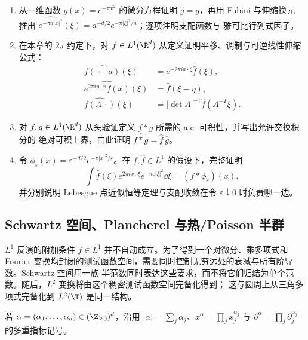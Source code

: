\begin{exercise}
\begin{enumerate}
  \item 从一维函数 $g(x)=e^{-\pi x^2}$ 的微分方程证明 $\widehat g=g$，再用 Fubini 与伸缩换元
        推出
        $\widehat{e^{-\pi a|x|^2}}(\xi)=a^{-d/2}e^{-\pi|\xi|^2/a}$；逐项注明支配函数与
        雅可比行列式因子。
  \item 在本章的 $2\pi$ 约定下，对 $f\in L^1(\R^d)$ 从定义证明平移、调制与可逆线性伸缩公式：
        \[
        \begin{aligned}
        \widehat{f(\,\cdot-a)}(\xi)
          &=e^{-2\pi ia\cdot\xi}\widehat f(\xi),\\
        \widehat{e^{2\pi i\eta\cdot x}f(x)}(\xi)
          &=\widehat f(\xi-\eta),\\
        \widehat{f(A\,\cdot)}(\xi)
          &=|\det A|^{-1}\widehat f(A^{-T}\xi).
        \end{aligned}
        \]
  \item 对 $f,g\in L^1(\R^d)$ 从头验证定义 $f*g$ 所需的 a.e. 可积性，并写出允许交换积分的
        绝对可积上界，由此证明 $\widehat{f*g}=\widehat f\,\widehat g$。
  \item 令 $\phi_\varepsilon(x)=\varepsilon^{-d/2}e^{-\pi|x|^2/\varepsilon}$。在
        $f,\widehat f\in L^1$ 的假设下，完整证明
        \[
        \int\widehat f(\xi)e^{2\pi ix\cdot\xi}e^{-\pi\varepsilon|\xi|^2}\dd\xi
        =(f*\phi_\varepsilon)(x),
        \]
        并分别说明 Lebesgue 点近似恒等定理与支配收敛在令 $\varepsilon\downarrow0$ 时负责哪一边。
\end{enumerate}
\end{exercise}


\subsection{Schwartz 空间、Plancherel 与热/Poisson 半群}\label{subsec:7-2-3}

$L^1$ 反演的附加条件 $\widehat f\in L^1$ 并不自动成立。为了得到一个对微分、乘多项式和
Fourier 变换均封闭的测试函数空间，需要同时控制无穷远处的衰减与所有阶导数。Schwartz 空间用一族
半范数同时表达这些要求，而不将它们归结为单个范数。随后，$L^2$ 变换将由这个稠密测试函数空间完备化得到；
这与圆周上从三角多项式完备化到 $L^2(\T)$ 是同一结构。

若 $\alpha=(\alpha_1,\ldots,\alpha_d)\in(\Z_{\geq0})^d$，沿用
$|\alpha|=\sum_j\alpha_j$、$x^\alpha=\prod_jx_j^{\alpha_j}$ 与
$\partial^\alpha=\prod_j\partial_j^{\alpha_j}$ 的多重指标记号。

